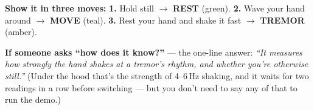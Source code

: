 \documentclass[11pt]{article}
\begin{document}
\vspace{6pt}

\begin{tcolorbox}[enhanced, colback=white, colframe=ink!70, boxrule=0.8pt, arc=3pt,
  left=12pt, right=12pt, top=7pt, bottom=7pt]
  {\large\bfseries Show it in three moves:}\quad
  \textbf{1.} Hold still $\rightarrow$ \textbf{\color{good}REST} (green).\quad
  \textbf{2.} Wave your hand around $\rightarrow$ \textbf{\color{teal}MOVE} (teal).\quad
  \textbf{3.} Rest your hand and shake it fast $\rightarrow$ \textbf{\color{amber!85!black}TREMOR} (amber).
\end{tcolorbox}

\vspace{4pt}
{\footnotesize\color{muted}\textbf{If someone asks ``how does it know?''} --- the
one-line answer: \emph{``It measures how strongly the hand shakes at a tremor's
rhythm, and whether you're otherwise still.''} (Under the hood that's the
strength of 4--6\,Hz shaking, and it waits for two readings in a row before
switching --- but you don't need to say any of that to run the demo.)}
\end{document}
